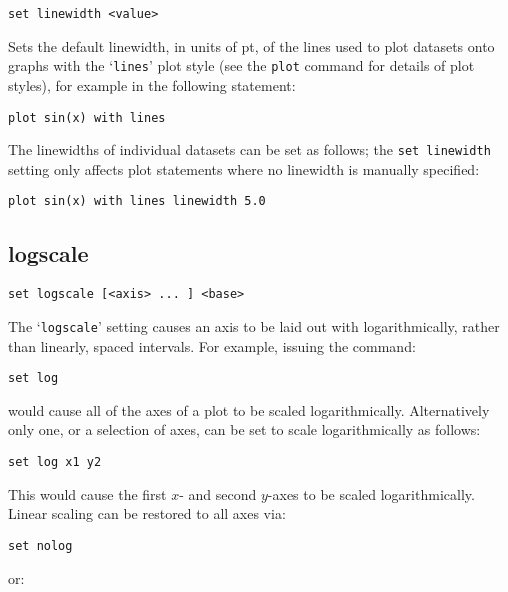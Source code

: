 \begin{verbatim}
set linewidth <value>
\end{verbatim}

Sets the default linewidth, in units of pt, of the lines used to plot datasets
onto graphs with the `{\tt lines}' plot style (see the {\tt plot} command for
details of plot styles), for example in the following statement:

\begin{verbatim}
plot sin(x) with lines
\end{verbatim}

The linewidths of individual datasets can be set as follows; the {\tt set
linewidth} setting only affects plot statements where no linewidth is manually
specified:

\begin{verbatim}
plot sin(x) with lines linewidth 5.0
\end{verbatim}


\subsection{logscale}

\begin{verbatim}
set logscale [<axis> ... ] <base>
\end{verbatim}

The `{\tt logscale}' setting causes an axis to be laid out with logarithmically,
rather than linearly, spaced intervals.  For example, issuing the command:

\begin{verbatim}
set log
\end{verbatim}

\noindent would cause all of the axes of a plot to be scaled logarithmically. Alternatively
only one, or a selection of axes, can be set to scale logarithmically as
follows:

\begin{verbatim}
set log x1 y2
\end{verbatim}

This would cause the first $x$- and second $y$-axes to be scaled logarithmically.
Linear scaling can be restored to all axes via:

\begin{verbatim}
set nolog
\end{verbatim}

\noindent or:

